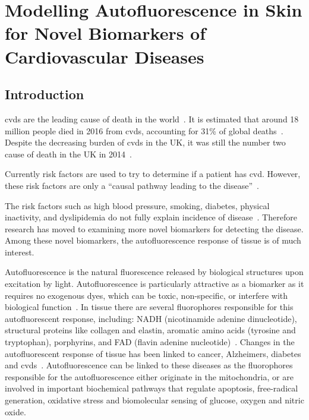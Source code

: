 \chapter{Modelling Autofluorescence in Skin for Novel Biomarkers of Cardiovascular Diseases}
\label{chap:salvo}




\section{Introduction}


\Gls*{cvds} are the leading cause of death in the world~\cite{whodeath}.
It is estimated that around 18 million people died in 2016 from \gls*{cvds}, accounting for 31\% of global deaths~\cite{whodeath}.
Despite the decreasing burden of \gls*{cvds} in the UK, it was still the number two cause of death in the UK in 2014~\cite{bhatnagar2016trends}.

Currently risk factors are used to try to determine if a patient has \gls*{cvd}.
However, these risk factors are only a ``causal pathway leading to the disease''~\cite{vasan2006biomarkers}.

The risk factors such as high blood pressure, smoking, diabetes, physical inactivity, and dyslipidemia do not fully explain incidence of disease~\cite{olsen2010assessment,folsom2013classical}.
Therefore research has moved to examining more novel biomarkers for detecting the disease.
Among these novel biomarkers, the autofluorescence response of tissue is of much interest.

Autofluorescence is the natural fluorescence released by biological structures upon excitation by light.
Autofluorescence is particularly attractive as a biomarker as it requires no exogenous dyes, which can be toxic, non-specific, or interfere with biological function~\cite{kollias1998endogenous}.
In tissue there are several fluorophores responsible for this autofluorescent response, including: NADH (nicotinamide adenine dinucleotide), structural proteins like collagen and elastin, aromatic amino acids (tyrosine and tryptophan), porphyrins, and FAD (flavin adenine nucleotide)~\cite{monici2005cell}.
Changes in the autofluorescent response of tissue has been linked to cancer, Alzheimers, diabetes and \gls*{cvds}~\cite{drakaki2009laser,pu2013native,ramanujam2000fluorescence,tarnawska2018pilot,van2019skin}.
Autofluorescence can be linked to these diseases as the fluorophores responsible for the autofluorescence either originate in the mitochondria, or are involved in important biochemical pathways that regulate apoptosis, free-radical generation, oxidative stress and biomolecular sensing of glucose, oxygen and nitric oxide.

